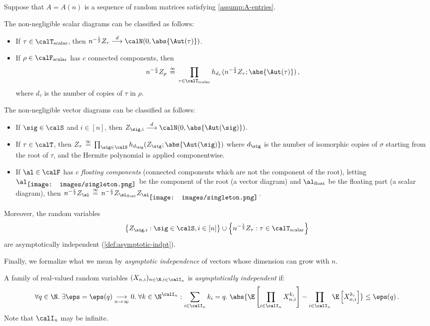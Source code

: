 \documentclass[12pt]{article}
\newcommand{\smallrootpic}{\vcenter{\hbox{\texttt{[image: images/singleton.png]}}}}
\newcommand{\scalar}{\textnormal{scalar}}
\newcommand{\float}{\textnormal{float}}
\newcommand{\eqinf}{\,\overset{\infty}{=}\,}
\begin{document}
\begin{theorem}[Classification]\label{thm:classification}
    Suppose that $A=A(n)$ is a sequence of random matrices satisfying \cref{assump:A-entries}.
    
    The non-negligible scalar diagrams can be classified as follows:
    \begin{itemize}
        \item If $\tau\in\calT_{\scalar}$, then $n^{-\frac 1 2} Z_\tau \overset{d}{\longrightarrow} \calN(0, \abs{\Aut(\tau)})$.
        \item If $\rho \in \calF_{\scalar}$ has $c$ connected components, then 
        \[n^{-\frac c 2} Z_\rho \eqinf \prod_{\tau \in \calT_{\scalar}} h_{d_\tau}(n^{-\frac 1 2}Z_{\tau}; \abs{\Aut(\tau)})\,,\]
        where $d_\tau$ is the number of copies of $\tau$ in $\rho$.
    \end{itemize}
    The non-negligible vector diagrams can be classified as follows:
    \begin{itemize}
        \item If $\sig \in \calS$ and $i\in [n]$, then $Z_{\sig, i} \overset{d}{\longrightarrow} \calN(0, \abs{\Aut(\sig)})$.
        \item If $\tau \in \calT$, then $Z_{\tau} \eqinf \prod_{\sig \in \calS} h_{d_\sig}(Z_{\sig}; \abs{\Aut(\sig)})$
        where $d_\sig$ is the number of isomorphic copies of $\sigma$ starting from the root of $\tau$,
        and the Hermite polynomial is applied componentwise.
        \item If $\al\in \calF$ has $c$ 
        \textit{floating components}
        (connected components which are not the component of the root), letting $\al_{\smallrootpic}$ be the component of the root (a vector diagram) and $\al_{\text{float}}$ be the floating part (a scalar diagram), then $n^{-\frac c 2}Z_\al \eqinf n^{-\frac c 2}Z_{\al_{\float}} Z_{\al_{\smallrootpic}}$.
    \end{itemize}
    Moreover, the random variables
    \[
        \left\{Z_{\sig, i} : \sig \in \calS, i \in [n]\right\} \cup \left\{n^{-\frac 1 2} Z_{\tau} : \tau \in \calT_{\scalar}\right\}
    \]
    are asymptotically independent (\cref{def:asymptotic-indpt}).
\end{theorem}

Finally, we formalize what we mean by \textit{asymptotic independence} of vectors whose dimension can grow with $n$.
\begin{definition}
\label{def:asymptotic-indpt}
    A family of real-valued random variables $(X_{n,i})_{n\in\N,i\in \calI_n}$ is \textit{asymptotically independent} if:
    \[ \forall q \in \N.\; \exists \eps=\eps(q) \underset{n\to\infty}{\longrightarrow} 0. \; \forall k  \in \N^{\calI_n} : \sum_{i \in \calI_n} k_i = q.\;
    \abs{\E\left[ \prod_{i \in \calI_n} X_{n,i}^{k_i}\right] - \prod_{i \in \calI_n}\E\left[X_{n,i}^{k_i}\right]} \le \eps(q)\,.\]
    Note that $\calI_n$ may be infinite.
\end{definition}
\end{document}
